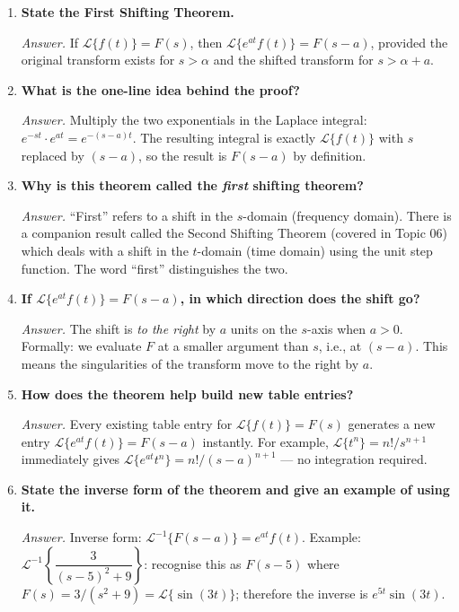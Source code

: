 \documentclass[12pt,a4paper]{article}
\begin{document}
\begin{enumerate}[label=\textbf{Q\arabic*.}, leftmargin=*, itemsep=1em]

\item \textbf{State the First Shifting Theorem.}

\textit{Answer.}
If $\mathcal{L}\{f(t)\} = F(s)$, then $\mathcal{L}\{e^{at}f(t)\} = F(s-a)$,
provided the original transform exists for $s > \alpha$ and the shifted transform for $s > \alpha + a$.

\item \textbf{What is the one-line idea behind the proof?}

\textit{Answer.}
Multiply the two exponentials in the Laplace integral:
$e^{-st}\cdot e^{at} = e^{-(s-a)t}$.
The resulting integral is exactly $\mathcal{L}\{f(t)\}$ with $s$ replaced by $(s-a)$,
so the result is $F(s-a)$ by definition.

\item \textbf{Why is this theorem called the \emph{first} shifting theorem?}

\textit{Answer.}
``First'' refers to a shift in the $s$-domain (frequency domain).
There is a companion result called the Second Shifting Theorem (covered in Topic 06)
which deals with a shift in the $t$-domain (time domain) using the unit step function.
The word ``first'' distinguishes the two.

\item \textbf{If $\mathcal{L}\{e^{at}f(t)\} = F(s-a)$, in which direction does the shift go?}

\textit{Answer.}
The shift is \emph{to the right} by $a$ units on the $s$-axis when $a > 0$.
Formally: we evaluate $F$ at a smaller argument than $s$, i.e., at $(s-a)$.
This means the singularities of the transform move to the right by $a$.

\item \textbf{How does the theorem help build new table entries?}

\textit{Answer.}
Every existing table entry for $\mathcal{L}\{f(t)\} = F(s)$ generates a new entry
$\mathcal{L}\{e^{at}f(t)\} = F(s-a)$ instantly.
For example, $\mathcal{L}\{t^n\} = n!/s^{n+1}$ immediately gives
$\mathcal{L}\{e^{at}t^n\} = n!/(s-a)^{n+1}$ --- no integration required.

\item \textbf{State the inverse form of the theorem and give an example of using it.}

\textit{Answer.}
Inverse form: $\mathcal{L}^{-1}\{F(s-a)\} = e^{at}f(t)$.
Example: $\mathcal{L}^{-1}\!\left\{\dfrac{3}{(s-5)^2+9}\right\}$:
recognise this as $F(s-5)$ where $F(s) = 3/(s^2+9) = \mathcal{L}\{\sin(3t)\}$;
therefore the inverse is $e^{5t}\sin(3t)$.


\end{enumerate}
\end{document}
